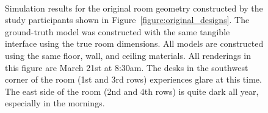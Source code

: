 \begin{figure}[t]
\begin{small}
\vspace{-0.325\textwidth}
\begin{minipage}{\figwidth}~{\color{white}{\bf N1}}\end{minipage} \hfill
\begin{minipage}{\figwidth}~{\color{white}{\bf N2}}\end{minipage} \hfill
\begin{minipage}{\figwidth}~{\color{white}{\bf N3}}\end{minipage} \hfill
\begin{minipage}{\figwidth}~{\color{white}{\bf N4}}\end{minipage} \hfill
\begin{minipage}{\figwidth}~{\color{white}{\bf N5}}\end{minipage} \hfill
\begin{minipage}{\figwidth}~{\color{white}{\bf N6}}\end{minipage}
\vspace{0.24\textwidth}
\end{small}

\caption{ Simulation results for the original room geometry
  constructed by the study participants shown in
  Figure~\ref{figure:original_designs}.  The ground-truth model was
  constructed with the same tangible interface using the true room
  dimensions.  All models are constructed using the same floor, wall,
  and ceiling materials.  All renderings in this figure are March 21st
  at 8:30am.  The desks in the southwest corner of the room (1st and
  3rd rows) experiences glare at this time.  The east side of the room
  (2nd and 4th rows) is quite dark all year, especially in the
  mornings.  }
\vspace{-0.1in}
\label{figure:renderingsOfOriginalGeometry}
\end{figure}


